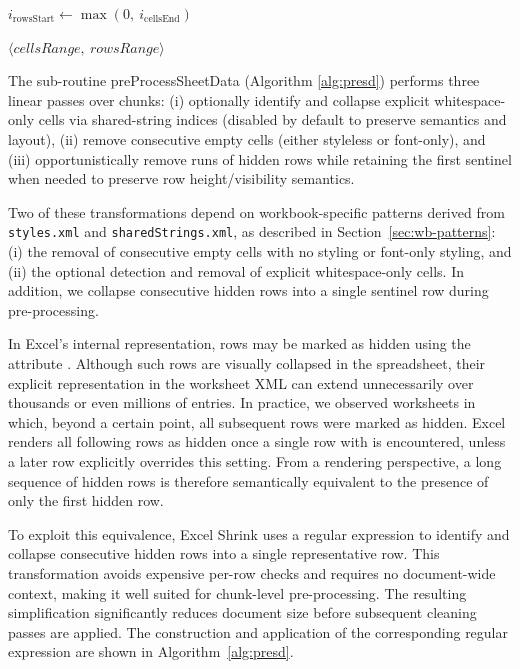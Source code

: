 \documentclass[conference]{IEEEtran}
\begin{document}
\begin{algorithm}[t]
{  \BlankLine

  $i_{\mathrm{rowsStart}} \gets \max(0,\ i_{\mathrm{cellsEnd}})$\;

  \BlankLine
    \KwRet $\langle \textit{cellsRange},\ \textit{rowsRange}\rangle$\;

}
\end{algorithm}



The sub-routine \textsf{preProcessSheetData} (Algorithm \ref{alg:presd}) performs three linear passes over chunks:
(i) optionally identify and collapse explicit whitespace-only cells
via shared-string indices (disabled by default to preserve semantics and layout),
(ii) remove consecutive empty cells (either styleless or font-only),
and (iii) opportunistically remove runs of hidden rows
while retaining the first sentinel
when needed to preserve row height/visibility semantics.

Two of these transformations depend on workbook-specific patterns
derived from \texttt{styles.xml} and \texttt{sharedStrings.xml},
as described in Section~\ref{sec:wb-patterns}:
(i) the removal of consecutive empty cells with no styling or font-only styling,
and (ii) the optional detection and removal of explicit whitespace-only cells.
In addition, we collapse consecutive hidden rows into a single sentinel row
during pre-processing.

In Excel's internal representation, rows may be marked as hidden using the attribute
.
Although such rows are visually collapsed in the spreadsheet,
their explicit representation in the worksheet XML can extend unnecessarily
over thousands or even millions of entries.
In practice, we observed worksheets in which, beyond a certain point,
all subsequent rows were marked as hidden.
Excel renders all following rows as hidden
once a single row with  is encountered,
unless a later row explicitly overrides this setting.
From a rendering perspective, a long sequence of hidden rows
is therefore semantically equivalent to the presence of only the first hidden row.

To exploit this equivalence, Excel Shrink uses a regular expression
to identify and collapse consecutive hidden rows into a single representative row.
This transformation avoids expensive per-row checks
and requires no document-wide context,
making it well suited for chunk-level pre-processing.
The resulting simplification significantly reduces document size
before subsequent cleaning passes are applied.
The construction and application of the corresponding regular expression
are shown in Algorithm~\ref{alg:presd}.
\end{document}
